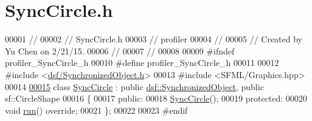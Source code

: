 \hypertarget{_sync_circle_8h_source}{}\section{Sync\+Circle.\+h}
\label{_sync_circle_8h_source}

\begin{DoxyCode}
00001 \textcolor{comment}{//}
00002 \textcolor{comment}{//  SyncCircle.h}
00003 \textcolor{comment}{//  profiler}
00004 \textcolor{comment}{//}
00005 \textcolor{comment}{//  Created by Yu Chen on 2/21/15.}
00006 \textcolor{comment}{//}
00007 \textcolor{comment}{//}
00008 
00009 \textcolor{preprocessor}{#ifndef profiler\_SyncCircle\_h}
00010 \textcolor{preprocessor}{#define profiler\_SyncCircle\_h}
00011 
00012 \textcolor{preprocessor}{#include <\hyperlink{_synchronized_object_8h}{dsf/SynchronizedObject.h}>}
00013 \textcolor{preprocessor}{#include <SFML/Graphics.hpp>}
00014 
\hypertarget{_sync_circle_8h_source_l00015}{}\hyperlink{class_sync_circle}{00015} \textcolor{keyword}{class }\hyperlink{class_sync_circle}{SyncCircle} : \textcolor{keyword}{public} \hyperlink{classdsf_1_1_synchronized_object}{dsf::SynchronizedObject}, \textcolor{keyword}{public} sf::CircleShape
00016 \{
00017 \textcolor{keyword}{public}:
00018     \hyperlink{class_sync_circle_ac4137a95bfb88c1014059c57ceb92d2c}{SyncCircle}();
00019 \textcolor{keyword}{protected}:
00020     \textcolor{keywordtype}{void} \hyperlink{class_sync_circle_aa3087260d193fe4fee75b2adcfb986a3}{run}() \textcolor{keyword}{override};
00021 \};
00022 
00023 \textcolor{preprocessor}{#endif}
\end{DoxyCode}
